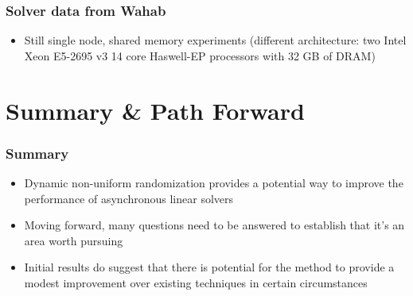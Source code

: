 \documentclass{beamer}
\begin{document}
\begin{frame}
	\frametitle{Solver data from Wahab}
	\begin{figure}
	    \centering
	\end{figure}
	\begin{itemize}
	    \item Still single node, shared memory experiments (different architecture: two Intel Xeon  E5-2695 v3 14 core Haswell-EP processors with  32 GB of DRAM)
	\end{itemize}
\end{frame}

\section{Summary \& Path Forward}

\begin{frame}
	\frametitle{Summary}
	\begin{itemize}
		\item Dynamic non-uniform randomization provides a potential way to improve the performance of asynchronous linear solvers
		\item Moving forward, many questions need to be answered to establish that it's an area worth pursuing
		\item Initial results do suggest that there is potential for the method to provide a modest improvement over existing techniques in certain circumstances
	\end{itemize}
\end{frame}
\end{document}
